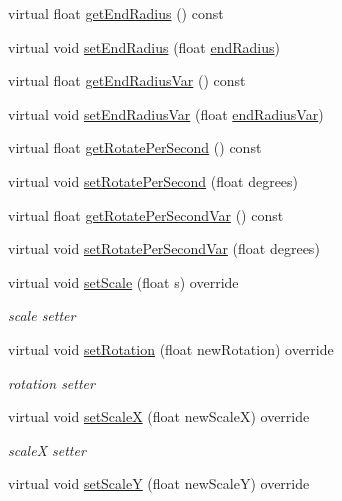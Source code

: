 \begin{DoxyCompactItemize}
\item 
virtual float \hyperlink{classParticleSystem_ace9c70a68a0429afa7d6adf81bed1b25}{get\+End\+Radius} () const
\item 
virtual void \hyperlink{classParticleSystem_a8692a22d320978b6b1ac256960abad4c}{set\+End\+Radius} (float \hyperlink{classParticleSystem_a26521c52751fab3520bfd1edbddb581f}{end\+Radius})
\item 
virtual float \hyperlink{classParticleSystem_a1991336eec162ea4a76b47b6a8ef13d8}{get\+End\+Radius\+Var} () const
\item 
virtual void \hyperlink{classParticleSystem_ac342662b4a04cda94275239f9a810f73}{set\+End\+Radius\+Var} (float \hyperlink{classParticleSystem_a9a50b646561863981982c5e850ee1c8b}{end\+Radius\+Var})
\item 
virtual float \hyperlink{classParticleSystem_a8acc5f0150ed8c53b87153d8ac36fec6}{get\+Rotate\+Per\+Second} () const
\item 
virtual void \hyperlink{classParticleSystem_ae55fdc52e868e9b4ed14ec02b1004906}{set\+Rotate\+Per\+Second} (float degrees)
\item 
virtual float \hyperlink{classParticleSystem_a9d014325a6b60ca10e0edbf8c2ac68c0}{get\+Rotate\+Per\+Second\+Var} () const
\item 
virtual void \hyperlink{classParticleSystem_a7ff95cb1df5688f5646475933d3a9291}{set\+Rotate\+Per\+Second\+Var} (float degrees)
\item 
virtual void \hyperlink{classParticleSystem_a9bf57aacb9df62eb5e836c2504904678}{set\+Scale} (float s) override
\begin{DoxyCompactList}\small\item\em scale setter \end{DoxyCompactList}\item 
virtual void \hyperlink{classParticleSystem_a0616c2ca4a0618b811c692e30aa9213f}{set\+Rotation} (float new\+Rotation) override
\begin{DoxyCompactList}\small\item\em rotation setter \end{DoxyCompactList}\item 
virtual void \hyperlink{classParticleSystem_a48e07e72b7694502ed1375c1df37f9fe}{set\+ScaleX} (float new\+ScaleX) override
\begin{DoxyCompactList}\small\item\em scaleX setter \end{DoxyCompactList}\item 
virtual void \hyperlink{classParticleSystem_a1e6720f314dfec3f5b7ca02c305ea28e}{set\+ScaleY} (float new\+ScaleY) override

\end{DoxyCompactItemize}
